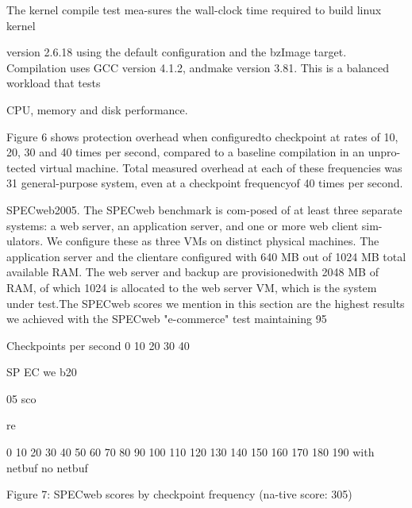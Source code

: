 The kernel compile test mea-sures the wall-clock time required to build linux kernel

version 2.6.18 using the default configuration and the bzImage target. Compilation uses GCC version 4.1.2, andmake version 3.81. This is a balanced workload that tests

CPU, memory and disk performance.

Figure 6 shows protection overhead when configuredto checkpoint at rates of 10, 20, 30 and 40 times per second, compared to a baseline compilation in an unpro-tected virtual machine. Total measured overhead at each
of these frequencies was 31%
general-purpose system, even at a checkpoint frequencyof 40 times per second.

SPECweb2005. The SPECweb benchmark is com-posed of at least three separate systems: a web server,
an application server, and one or more web client sim-ulators. We configure these as three VMs on distinct
physical machines. The application server and the clientare configured with 640 MB out of 1024 MB total available RAM. The web server and backup are provisionedwith 2048 MB of RAM, of which 1024 is allocated
to the web server VM, which is the system under test.The SPECweb scores we mention in this section are
the highest results we achieved with the SPECweb "e-commerce" test maintaining 95%

Checkpoints per second
0 10 20 30 40

SP
EC
we
b20

05 
sco

re

0
10
20
30
40
50
60
70
80
90
100
110
120
130
140
150
160
170
180
190 with netbuf no netbuf

Figure 7: SPECweb scores by checkpoint frequency (na-tive score: 305)

